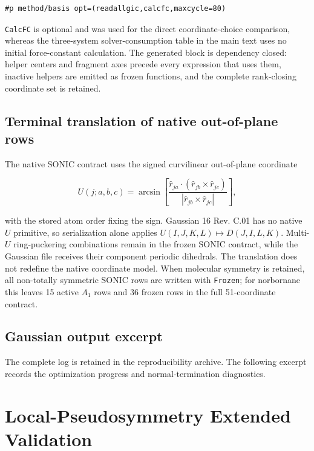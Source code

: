\documentclass[10pt]{article}
\begin{document}
\begin{lstlisting}
#p method/basis opt=(readallgic,calcfc,maxcycle=80)
\end{lstlisting}

\texttt{CalcFC} is optional and was used for the direct coordinate-choice
comparison, whereas the three-system solver-consumption table in the main text
uses no initial force-constant calculation.  The generated block is dependency
closed: helper centers and fragment axes precede every expression that uses
them, inactive helpers are emitted as frozen functions, and the complete
rank-closing coordinate set is retained.

\subsection{Terminal translation of native out-of-plane rows}

The native SONIC contract uses the signed curvilinear out-of-plane coordinate

\[
U(j;a,b,c)=\arcsin\!\left[
\frac{\hat r_{ja}\cdot(\hat r_{jb}\times\hat r_{jc})}
{|\hat r_{jb}\times\hat r_{jc}|}\right],
\]

with the stored atom order fixing the sign.  Gaussian 16 Rev. C.01 has no
native \(U\) primitive, so serialization alone applies
\(U(I,J,K,L)\mapsto D(J,I,L,K)\).  Multi-\(U\) ring-puckering combinations
remain in the frozen SONIC contract, while the Gaussian file receives their
component periodic dihedrals.  The translation does not redefine the native
coordinate model.  When molecular symmetry is retained, all non-totally
symmetric SONIC rows are written with \texttt{Frozen}; for norbornane this
leaves 15 active \(A_1\) rows and 36 frozen rows in the full 51-coordinate
contract.

\subsection{Gaussian output excerpt}

The complete log is retained in the reproducibility archive.  The following
excerpt records the optimization progress and normal-termination diagnostics.



\section{Local-Pseudosymmetry Extended Validation}
\end{document}
